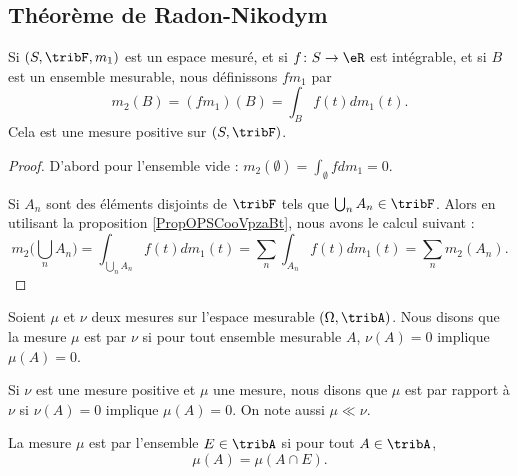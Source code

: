 \subsection{Théorème de Radon-Nikodym}

\begin{proposition}
    Si \( (S,\tribF,m_1)\) est un espace mesuré, et si \( f\colon S\to \eR\) est intégrable, et si \( B\) est un ensemble mesurable, nous définissons \( fm_1\) par
    \begin{equation}
        m_2(B)=(fm_1)(B)=\int_Bf(t)dm_1(t).
    \end{equation}
    Cela est une mesure positive sur \( (S,\tribF)\).
\end{proposition}

\begin{proof}
    D'abord pour l'ensemble vide : \( m_2(\emptyset)=\int_{\emptyset}fdm_1=0\).

    Si \( A_n\) sont des éléments disjoints de \( \tribF\) tels que \( \bigcup_nA_n\in\tribF\). Alors en utilisant la proposition \ref{PropOPSCooVpzaBt}, nous avons le calcul suivant :
    \begin{equation}
        m_2\big( \bigcup_nA_n \big)=\int_{\bigcup_nA_n}f(t)dm_1(t)=\sum_{n}\int_{A_n}f(t)dm_1(t)=\sum_nm_2(A_n).
    \end{equation}
\end{proof}

\begin{definition}
    Soient \( \mu\) et \( \nu\) deux mesures sur l'espace mesurable \( (\Omega,\tribA)\). Nous disons que la mesure \( \mu\) est  par \( \nu\) si pour tout ensemble mesurable \( A\), \( \nu(A)=0\) implique \( \mu(A)=0\).

    Si \( \nu\) est une mesure positive et \( \mu\) une mesure, nous disons que \( \mu\) est  par rapport à \( \nu\) si \( \nu(A)=0\) implique \( \mu(A)=0\). On note aussi \( \mu\ll\nu\).
\end{definition}

La mesure \( \mu\) est  par l'ensemble \( E\in\tribA\) si pour tout \( A\in\tribA\), 
\begin{equation}
    \mu(A)=\mu(A\cap E).
\end{equation}

